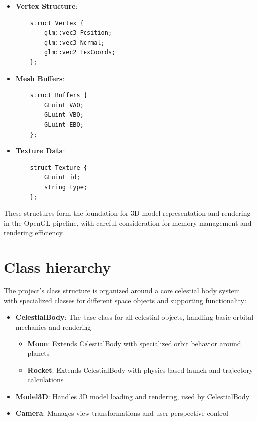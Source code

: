\documentclass[12pt]{report}
\begin{document}
\begin{itemize}
    \item \textbf{Vertex Structure}:
    \begin{verbatim}
    struct Vertex {
        glm::vec3 Position;
        glm::vec3 Normal;
        glm::vec2 TexCoords;
    };
    \end{verbatim}

    \item \textbf{Mesh Buffers}:
    \begin{verbatim}
    struct Buffers {
        GLuint VAO;
        GLuint VBO;
        GLuint EBO;
    };
    \end{verbatim}

    \item \textbf{Texture Data}:
    \begin{verbatim}
    struct Texture {
        GLuint id;
        string type;
    };
    \end{verbatim}
\end{itemize}

These structures form the foundation for 3D model representation and rendering in the OpenGL pipeline, with careful consideration for memory management and rendering efficiency.

\section{Class hierarchy}
The project's class structure is organized around a core celestial body system with specialized classes for different space objects and supporting functionality:

\begin{itemize}
    \item \textbf{CelestialBody}: The base class for all celestial objects, handling basic orbital mechanics and rendering
        \begin{itemize}
            \item \textbf{Moon}: Extends CelestialBody with specialized orbit behavior around planets
            \item \textbf{Rocket}: Extends CelestialBody with physics-based launch and trajectory calculations
        \end{itemize}
    \item \textbf{Model3D}: Handles 3D model loading and rendering, used by CelestialBody
    \item \textbf{Camera}: Manages view transformations and user perspective control
\end{itemize}
\end{document}
